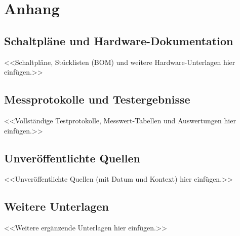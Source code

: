 
\appendix

\chapter{Anhang}
\label{chap:anhang}

\section{Schaltpläne und Hardware-Dokumentation}
<<Schaltpläne, Stücklisten (BOM) und weitere Hardware-Unterlagen hier einfügen.>>

\section{Messprotokolle und Testergebnisse}
<<Vollständige Testprotokolle, Messwert-Tabellen und Auswertungen hier einfügen.>>

\section{Unveröffentlichte Quellen}
<<Unveröffentlichte Quellen (mit Datum und Kontext) hier einfügen.>>

\section{Weitere Unterlagen}
<<Weitere ergänzende Unterlagen hier einfügen.>>
